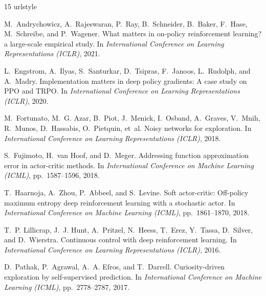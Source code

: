 \documentclass{article}
\begin{document}
\begin{thebibliography}{15}
\providecommand{\natexlab}[1]{#1}
\providecommand{\url}[1]{\texttt{#1}}
\expandafter\ifx\csname urlstyle\endcsname\relax
  \providecommand{\doi}[1]{doi: #1}\else
  \providecommand{\doi}{doi: \begingroup \urlstyle{rm}\Url}\fi

M.~Andrychowicz, A.~Rajeswaran, P.~Ray, B.~Schneider, B.~Baker, F.~Hase, M.~Schreibe, and P.~Wagener.
\newblock What matters in on-policy reinforcement learning? a large-scale empirical study.
\newblock In \emph{International Conference on Learning Representations (ICLR)}, 2021.

L.~Engstrom, A.~Ilyas, S.~Santurkar, D.~Tsipras, F.~Janoos, L.~Rudolph, and A.~Madry.
\newblock Implementation matters in deep policy gradients: A case study on {PPO} and {TRPO}.
\newblock In \emph{International Conference on Learning Representations (ICLR)}, 2020.

M.~Fortunato, M.~G. Azar, B.~Piot, J.~Menick, I.~Osband, A.~Graves, V.~Mnih, R.~Munos, D.~Hassabis, O.~Pietquin, et~al.
\newblock Noisy networks for exploration.
\newblock In \emph{International Conference on Learning Representations (ICLR)}, 2018.

S.~Fujimoto, H.~van Hoof, and D.~Meger.
\newblock Addressing function approximation error in actor-critic methods.
\newblock In \emph{International Conference on Machine Learning (ICML)}, pp.\ 1587--1596, 2018.

T.~Haarnoja, A.~Zhou, P.~Abbeel, and S.~Levine.
\newblock Soft actor-critic: Off-policy maximum entropy deep reinforcement learning with a stochastic actor.
\newblock In \emph{International Conference on Machine Learning (ICML)}, pp.\ 1861--1870, 2018.

T.~P. Lillicrap, J.~J. Hunt, A.~Pritzel, N.~Heess, T.~Erez, Y.~Tassa, D.~Silver, and D.~Wierstra.
\newblock Continuous control with deep reinforcement learning.
\newblock In \emph{International Conference on Learning Representations (ICLR)}, 2016.

D.~Pathak, P.~Agrawal, A.~A. Efros, and T.~Darrell.
\newblock Curiosity-driven exploration by self-supervised prediction.
\newblock In \emph{International Conference on Machine Learning (ICML)}, pp.\ 2778--2787, 2017.


\end{thebibliography}
\end{document}
